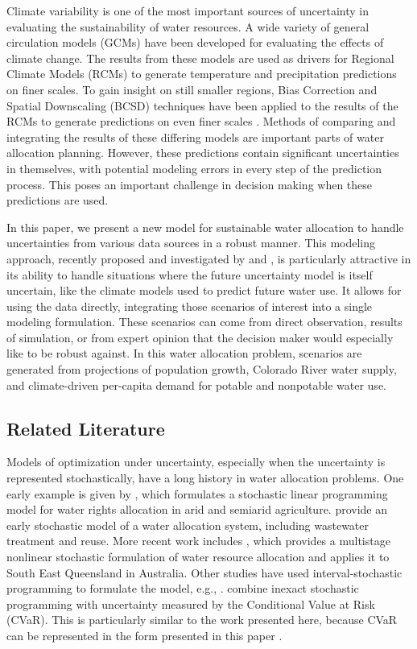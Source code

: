 \documentclass[11pt]{article}
\theoremstyle{plain}
\theoremstyle{definition}
\theoremstyle{remark}
\begin{document}
Climate variability is one of the most important sources of uncertainty in evaluating the sustainability of water resources.
A wide variety of general circulation models (GCMs) have been developed for evaluating the effects of climate change.
The results from these models are used as drivers for Regional Climate Models (RCMs) to generate temperature and precipitation predictions on finer scales.
To gain insight on still smaller regions, Bias Correction and Spatial Downscaling (BCSD) techniques have been applied to the results of the RCMs to generate predictions on even finer scales \citep{bcsdreclamation}.
Methods of comparing and integrating the results of these differing models are important parts of water allocation planning.
However, these predictions contain significant uncertainties in themselves, with potential modeling errors in every step of the prediction process.
This poses an important challenge in decision making when these predictions are used.

In this paper, we present a new model for sustainable water allocation to handle uncertainties from various data sources in a robust manner.
This modeling approach, recently proposed and investigated by \citet{bental2011robust} and \citet{love2013phi}, is particularly attractive in its ability to handle situations where the future uncertainty model is itself uncertain, like the climate models used to predict future water use.
It allows for using the data directly, integrating those scenarios of interest into a single modeling formulation.
These scenarios can come from direct observation, results of simulation, or from expert opinion that the decision maker would especially like to be robust against.
In this water allocation problem, scenarios are generated from projections of population growth, Colorado River water supply, and climate-driven per-capita demand for potable and nonpotable water use.

\subsection{Related Literature}

Models of optimization under uncertainty, especially when the uncertainty is represented stochastically, have a long history in water allocation problems.
One early example is given by \citet{hall1970optimal}, which formulates a stochastic linear programming model for water rights allocation in arid and semiarid agriculture.
\citet{bishop1975optimization} provide an early stochastic model of a water allocation system, including wastewater treatment and reuse.
More recent work includes \citet{higgins2008stochastic}, which provides a multistage nonlinear stochastic formulation of water resource allocation and applies it to South East Queensland in Australia.
Other studies have used interval-stochastic programming to formulate the model, e.g., \citep{li2009multistage}.
\citet{shao2011conditional} combine inexact stochastic programming with uncertainty measured by the Conditional Value at Risk (CVaR).
This is particularly similar to the work presented here, because CVaR can be represented in the form presented in this paper \citep{love2013phi}.
\end{document}
